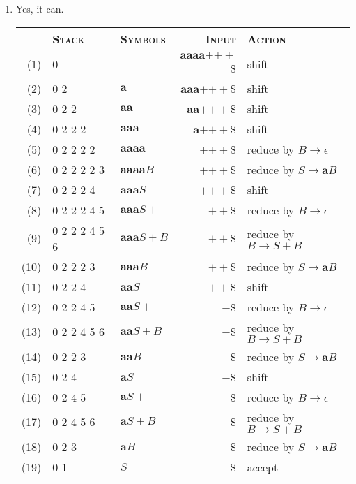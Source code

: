 \documentclass{CompilerAssignment}
\newcommand{\mbfa}{\mathbf{a}}
\begin{document}
\begin{enumerate}
    \item Yes, it can.
    \begin{center}
        \begin{tabular}{r|l|l|r|l}
            \hline \hline
            & \textsc{Stack} & \textsc{Symbols} & \textsc{Input} & \textsc{Action} \\ \hline
            (1) & 0 & & \(\mbfa\mbfa\mbfa\mbfa\)\(+\)\(++\)\$ & shift \\
            (2) & 0 2 & \(\mbfa\) & \(\mbfa\mbfa\mbfa\)\(+\)\(++\)\$ & shift \\
            (3) & 0 2 2 & \(\mbfa\mbfa\) & \(\mbfa\mbfa\)\(+\)\(++\)\$ & shift \\
            (4) & 0 2 2 2 & \(\mbfa\mbfa\mbfa\) & \(\mbfa\)\(+\)\(++\)\$ & shift \\
            (5) & 0 2 2 2 2 & \(\mbfa\mbfa\mbfa\mbfa\) & \(+\)\(++\)\$ & reduce by \(B \rightarrow \epsilon\) \\
            (6) & 0 2 2 2 2 3 & \(\mbfa\mbfa\mbfa\mbfa B\) & \(+\)\(++\)\$ & reduce by \(S \rightarrow \mbfa B\) \\
            (7) & 0 2 2 2 4 & \(\mbfa\mbfa\mbfa S\) & \(+\)\(++\)\$ & shift \\
            (8) & 0 2 2 2 4 5 & \(\mbfa\mbfa\mbfa S+\) & \(++\)\$ & reduce by \(B \rightarrow \epsilon\) \\
            (9) & 0 2 2 2 4 5 6 & \(\mbfa\mbfa\mbfa S+B\) & \(++\)\$ & reduce by \(B \rightarrow S + B\) \\
            (10) & 0 2 2 2 3 & \(\mbfa\mbfa\mbfa B\) & \(++\)\$ & reduce by \(S \rightarrow \mbfa B\) \\
            (11) & 0 2 2 4 & \(\mbfa\mbfa S\) & \(++\)\$ & shift \\
            (12) & 0 2 2 4 5 & \(\mbfa\mbfa S+\) & \(+\)\$ & reduce by \(B \rightarrow \epsilon\) \\
            (13) & 0 2 2 4 5 6 & \(\mbfa\mbfa S+B\) & \(+\)\$ & reduce by \(B \rightarrow S + B\) \\
            (14) & 0 2 2 3 & \(\mbfa\mbfa B\) & \(+\)\$ & reduce by \(S \rightarrow \mbfa B\) \\
            (15) & 0 2 4 & \(\mbfa S\) & \(+\)\$ & shift \\
            (16) & 0 2 4 5 & \(\mbfa S+\) & \$ & reduce by \(B \rightarrow \epsilon\) \\
            (17) & 0 2 4 5 6 & \(\mbfa S+B\) & \$ & reduce by \(B \rightarrow S + B\) \\
            (18) & 0 2 3 & \(\mbfa B\) & \$ & reduce by \(S \rightarrow \mbfa B\) \\
            (19) & 0 1 & \(S\) & \$ & accept \\
            \hline
        \end{tabular}
    \end{center}
\end{enumerate}
\end{document}
